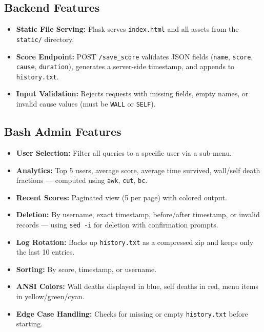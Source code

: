 \documentclass[12pt,a4paper]{article}
\begin{document}
\subsection{Backend Features}

\begin{itemize}
    \item \textbf{Static File Serving:} Flask serves \texttt{index.html} and all assets from the \texttt{static/} directory.

    \item \textbf{Score Endpoint:} POST \texttt{/save\_score} validates JSON fields (\texttt{name}, \texttt{score}, \texttt{cause}, \texttt{duration}), generates a server-side timestamp, and appends to \texttt{history.txt}.

    \item \textbf{Input Validation:} Rejects requests with missing fields, empty names, or invalid cause values (must be \texttt{WALL} or \texttt{SELF}).
\end{itemize}

\subsection{Bash Admin Features}

\begin{itemize}
    \item \textbf{User Selection:} Filter all queries to a specific user via a sub-menu.
    \item \textbf{Analytics:} Top 5 users, average score, average time survived, wall/self death fractions --- computed using \texttt{awk}, \texttt{cut}, \texttt{bc}.
    \item \textbf{Recent Scores:} Paginated view (5 per page) with colored output.
    \item \textbf{Deletion:} By username, exact timestamp, before/after timestamp, or invalid records --- using \texttt{sed -i} for deletion with confirmation prompts.
    \item \textbf{Log Rotation:} Backs up \texttt{history.txt} as a compressed zip and keeps only the last 10 entries.
    \item \textbf{Sorting:} By score, timestamp, or username.
    \item \textbf{ANSI Colors:} Wall deaths displayed in blue, self deaths in red, menu items in yellow/green/cyan.
    \item \textbf{Edge Case Handling:} Checks for missing or empty \texttt{history.txt} before starting.
\end{itemize}
\end{document}

